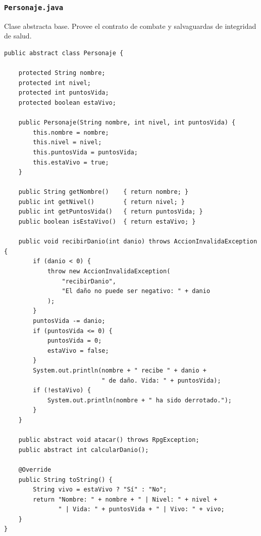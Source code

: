 \documentclass[11pt,letterpaper]{article}
\begin{document}
\subsubsection{\texttt{Personaje.java}}
Clase abstracta base. Provee el contrato de combate y salvaguardas de integridad de salud.
\begin{lstlisting}[style=JavaStyle]
public abstract class Personaje {

    protected String nombre;
    protected int nivel;
    protected int puntosVida;
    protected boolean estaVivo;

    public Personaje(String nombre, int nivel, int puntosVida) {
        this.nombre = nombre;
        this.nivel = nivel;
        this.puntosVida = puntosVida;
        this.estaVivo = true;
    }

    public String getNombre()    { return nombre; }
    public int getNivel()        { return nivel; }
    public int getPuntosVida()   { return puntosVida; }
    public boolean isEstaVivo()  { return estaVivo; }

    public void recibirDanio(int danio) throws AccionInvalidaException {
        if (danio < 0) {
            throw new AccionInvalidaException(
                "recibirDanio",
                "El daño no puede ser negativo: " + danio
            );
        }
        puntosVida -= danio;
        if (puntosVida <= 0) {
            puntosVida = 0;
            estaVivo = false;
        }
        System.out.println(nombre + " recibe " + danio +
                           " de daño. Vida: " + puntosVida);
        if (!estaVivo) {
            System.out.println(nombre + " ha sido derrotado.");
        }
    }

    public abstract void atacar() throws RpgException;
    public abstract int calcularDanio();

    @Override
    public String toString() {
        String vivo = estaVivo ? "Sí" : "No";
        return "Nombre: " + nombre + " | Nivel: " + nivel +
               " | Vida: " + puntosVida + " | Vivo: " + vivo;
    }
}
\end{lstlisting}
\end{document}
